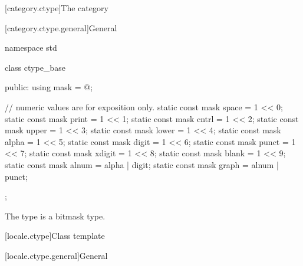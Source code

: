 [category.ctype]{The  category}

[category.ctype.general]{General}

%
\begin{codeblock}
namespace std {
  class ctype_base {
  public:
    using mask = @\seebelow@;

    // numeric values are for exposition only.
    static const mask space  = 1 << 0;
    static const mask print  = 1 << 1;
    static const mask cntrl  = 1 << 2;
    static const mask upper  = 1 << 3;
    static const mask lower  = 1 << 4;
    static const mask alpha  = 1 << 5;
    static const mask digit  = 1 << 6;
    static const mask punct  = 1 << 7;
    static const mask xdigit = 1 << 8;
    static const mask blank  = 1 << 9;
    static const mask alnum  = alpha | digit;
    static const mask graph  = alnum | punct;
  };
}
\end{codeblock}

\pnum
The type  is a bitmask type.

[locale.ctype]{Class template }

[locale.ctype.general]{General}

